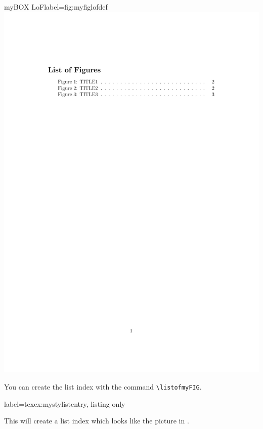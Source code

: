 \documentclass[]{myHOWTO-V001}
\begin{document}
\begin{minipage}{0.46\linewidth}
\centering
\begin{myFIGlst}{myBOX LoF}{label={fig:myfiglofdef}}
	\includegraphics[page=1,scale=0.18]{examples/myFIGV000.pdf}
\end{myFIGlst}
\end{minipage}
\begin{minipage}{0.46\linewidth}
You can create the list index with the command \Verb|\listofmyFIG|.
\\

\begin{myTEXEXdoclst}{}{label={texex:mystylistentry}, listing only}
\listofmyFIG
\end{myTEXEXdoclst}

This will create a list index which looks like the picture in . 
\end{minipage}
\end{document}
